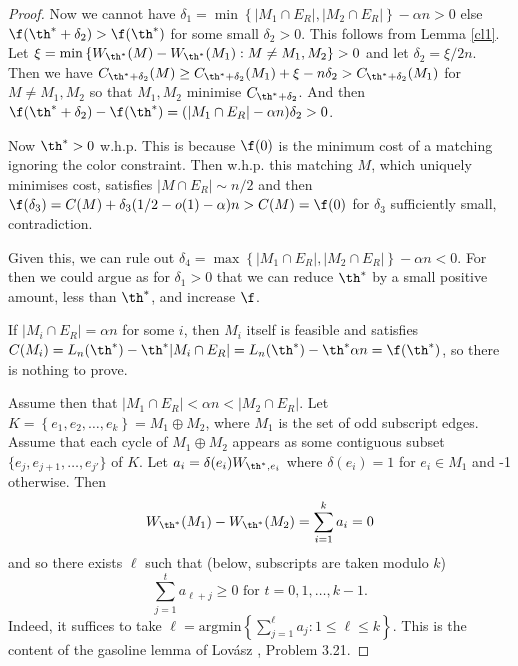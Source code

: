 \documentclass[12pt]{article}
\newcommand{\1}{\textbf{1}}
\def\a{\alpha} \def\b{\beta} \def\d{\delta} \def\D{\Delta}
\newcommand{\set}[1]{\left\{#1\right\}}
\newcommand{\beq}[2]{\begin{equation}\label{#1}#2\end{equation}}
\begin{document}
\begin{proof} 
Now we cannot have $\d_1= \min\set{|M_1\cap E_R|,|M_2\cap E_R|}-\a n>0$ else $\f(\th^*+\d_2)>\f(\th^*)$ for some small $\d_2>0$. This follows from Lemma \ref{cl1}. Let $\xi=\min\set{W_{\th^*}(M)-W_{\th^*}(M_1):M\neq M_1,M_2}>0$ and let $\d_2=\xi/2n$. Then we have $C_{\th^*+\d_2}(M)\geq C_{\th^*+\d_2}(M_1)+\xi-n\d_2>C_{\th^*+\d_2}(M_1)$ for $M\neq M_1,M_2$ so that $M_1,M_2$ minimise $C_{\th^*+\d_2}$. And then $\f(\th^*+\d_2)-\f(\th^*)=(|M_1\cap E_R|-\a n)\d_2>0$. 

Now $\th^*>0$ w.h.p. This is because $\f(0)$ is the minimum cost of a matching ignoring the color constraint. Then w.h.p. this matching $M$, which uniquely minimises cost, satisfies $|M\cap E_R|\sim n/2$ and then $\f(\d_3)=C(M)+\d_3(1/2-o(1)-\a)n>C(M)=\f(0)$ for $\d_3$ sufficiently small, contradiction. 

Given this, we can rule out $\d_4= \max\set{|M_1\cap E_R|,|M_2\cap E_R|}-\a n<0$. For then we could argue as for $\d_1>0$ that we can reduce $\th^*$ by a small positive amount, less than $\th^*$, and increase $\f$.  

If $|M_i \cap E_R | = \a n$ for some $i$, then $M_i$ itself is feasible and satisfies $C(M_i) = L_n(\th^*)-\th^*|M_i\cap E_R|=L_n(\th^*)-\th^*\a n=\f(\th^*)$, so there is nothing to prove.

Assume then that $|M_1\cap E_R|<\a n<|M_2\cap E_R|$. Let $K=\set{e_1,e_2,\ldots,e_k}=M_1\oplus M_2$, where $M_1$ is the set of odd subscript edges.  Assume that each cycle of $M_1 \oplus M_2$ appears as some contiguous subset $\{e_j, e_{j+1}, \ldots, e_{j'}\}$ of $K$. Let $a_i=\d(e_i)W_{\th^*, e_i}$ where $\d(e_i)=1$ for $e_i\in M_1$ and -1 otherwise. Then 
\[
W_{\th^*}(M_1)-W_{\th^*}(M_2)= \sum_{i=1}^ka_i=0
\]
 and so there exists $\ell$ such that (below, subscripts are taken modulo $k$)
\beq{1}{
\sum_{j=1}^ta_{\ell+j}\geq 0\text{ for }t=0,1,\ldots,k-1.
}
Indeed, it suffices to take $\ell = \text{argmin}\left\{\sum_{j=1}^\ell a_j: 1 \le \ell \le k \right\}$. This is the content of the gasoline lemma of Lov\'asz \cite{L}, Problem 3.21. 


\end{proof}
\end{document}

